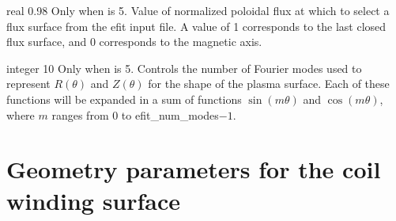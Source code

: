 \myhrule

{real}
{0.98}
{Only when  is 5.}
{Value of normalized poloidal flux at which to select a flux surface from the {\ttfamily efit} input file.
A value of 1 corresponds to the last closed flux surface, and 0 corresponds to the magnetic axis.}

\myhrule

{integer}
{10}
{Only when  is 5.}
{Controls the number of Fourier modes used to represent $R(\theta)$ and $Z(\theta)$ for the shape of
the plasma surface. Each of these functions will be expanded in a sum of functions $\sin(m\theta)$ and $\cos(m\theta)$,
where $m$ ranges from 0 to {\ttfamily efit\_num\_modes}$-1$.}

\section{Geometry parameters for the coil winding surface}

